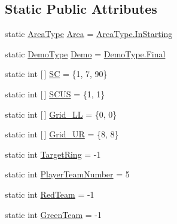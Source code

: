 \subsection*{Static Public Attributes}
\begin{DoxyCompactItemize}
\item 
static \hyperlink{enumca_1_1mcgill_1_1ecse211_1_1project_1_1_game_parameters_1_1_area_type}{Area\+Type} \hyperlink{enumca_1_1mcgill_1_1ecse211_1_1project_1_1_game_parameters_a32080f9c0e2e23c0feefc272620a07ad}{Area} = \hyperlink{enumca_1_1mcgill_1_1ecse211_1_1project_1_1_game_parameters_1_1_area_type_a90e9cb33114c7af62aa86684942265e5}{Area\+Type.\+In\+Starting}
\item 
static \hyperlink{enumca_1_1mcgill_1_1ecse211_1_1project_1_1_game_parameters_1_1_demo_type}{Demo\+Type} \hyperlink{enumca_1_1mcgill_1_1ecse211_1_1project_1_1_game_parameters_a36e932159f5f7e0f5e2e78f00d6f7e93}{Demo} = \hyperlink{enumca_1_1mcgill_1_1ecse211_1_1project_1_1_game_parameters_1_1_demo_type_a1ba3e060bfd5f76af77b713321abc7f6}{Demo\+Type.\+Final}
\item 
static int \mbox{[}$\,$\mbox{]} \hyperlink{enumca_1_1mcgill_1_1ecse211_1_1project_1_1_game_parameters_af3944d1bc80c4c8a6cabce66e030f4b7}{SC} = \{1, 7, 90\}
\item 
static int \mbox{[}$\,$\mbox{]} \hyperlink{enumca_1_1mcgill_1_1ecse211_1_1project_1_1_game_parameters_a9c136a3a3faff96052381f791bf4c166}{S\+C\+US} = \{1, 1\}
\item 
static int \mbox{[}$\,$\mbox{]} \hyperlink{enumca_1_1mcgill_1_1ecse211_1_1project_1_1_game_parameters_ab190471dbd9bb10d8cef92c1b8bea826}{Grid\+\_\+\+LL} = \{0, 0\}
\item 
static int \mbox{[}$\,$\mbox{]} \hyperlink{enumca_1_1mcgill_1_1ecse211_1_1project_1_1_game_parameters_afbbca622863f674dfb00dcd93e1328cb}{Grid\+\_\+\+UR} = \{8, 8\}
\item 
static int \hyperlink{enumca_1_1mcgill_1_1ecse211_1_1project_1_1_game_parameters_a58f3515615bd8e55a036615a23b8ff80}{Target\+Ring} = -\/1
\item 
static int \hyperlink{enumca_1_1mcgill_1_1ecse211_1_1project_1_1_game_parameters_aa3fb61a4aa9d34ab4dd029eccb6e056c}{Player\+Team\+Number} = 5
\item 
static int \hyperlink{enumca_1_1mcgill_1_1ecse211_1_1project_1_1_game_parameters_ad36fe5629718c944df7317e53145850c}{Red\+Team} = -\/1
\item 
static int \hyperlink{enumca_1_1mcgill_1_1ecse211_1_1project_1_1_game_parameters_a1d6292807667d219edc172574c2aedbc}{Green\+Team} = -\/1

\end{DoxyCompactItemize}
